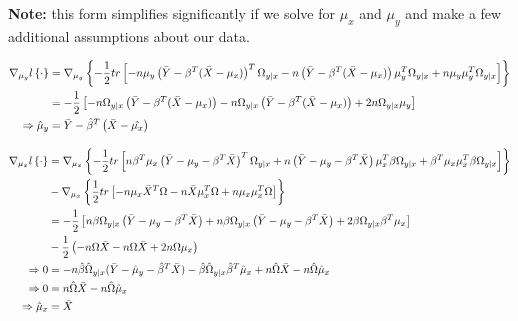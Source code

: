 \documentclass[11pt,]{report}
\begin{document}
\textbf{Note:} this form simplifies significantly if we solve for \(\mu_{x}\) and \(\mu_{y}\) and make a few additional assumptions about our data.

\begin{equation}
\begin{split}
 \nabla_{\mu_{y}}l\left\{\cdot\right\} &= \nabla_{\mu_{y}}\left\{ -\frac{1}{2}tr\left[ -n\mu_{y}\left(\bar{Y} - \beta^{T}(\bar{X} - \mu_{x})\right)^{T}\Omega_{y | x} - n\left(\bar{Y} - \beta^{T}(\bar{X} - \mu_{x})\right)\mu_{y}^{T}\Omega_{y | x} + n\mu_{y}\mu_{y}^{T}\Omega_{y | x} \right] \right\} \\
 &= -\frac{1}{2}\left[ -n\Omega_{y | x}\left(\bar{Y} - \beta^{T}(\bar{X} - \mu_{x}) \right) - n\Omega_{y | x}\left(\bar{Y} - \beta^{T}(\bar{X} - \mu_{x}) \right) + 2n\Omega_{y | x}\mu_{y} \right] \\
 \Rightarrow \hat{\mu}_{y} &= \bar{Y} - \hat{\beta}^{T}\left(\bar{X} - \hat{\mu_{x}}\right)
 \label{eq:gradient2}\notag
\end{split}
\end{equation}

\begin{equation}
\begin{split}
  \nabla_{\mu_{x}}l\left\{\cdot\right\} &= \nabla_{\mu_{x}}\left\{ -\frac{1}{2}tr\left[n\beta^{T}\mu_{x}\left(\bar{Y} - \mu_{y} - \beta^{T}\bar{X} \right)^{T}\Omega_{y | x} + n\left(\bar{Y} - \mu_{y} - \beta^{T}\bar{X} \right)\mu_{x}^{T}\beta\Omega_{y | x} + \beta^{T}\mu_{x}\mu_{x}^{T}\beta\Omega_{y | x} \right] \right\} \\
 &-\nabla_{\mu_{x}}\left\{\frac{1}{2}tr\left[ -n\mu_{x}\bar{X}^{T}\Omega - n\bar{X}\mu_{x}^{T}\Omega + n\mu_{x}\mu_{x}^{T}\Omega \right] \right\} \\
 &= -\frac{1}{2}\left[n\beta\Omega_{y | x}\left(\bar{Y} - \mu_{y} - \beta^{T}\bar{X} \right) + n\beta\Omega_{y | x}\left(\bar{Y} - \mu_{y} - \beta^{T}\bar{X} \right) + 2\beta\Omega_{y | x}\beta^{T}\mu_{x} \right] \\
 &-\frac{1}{2}\left( -n\Omega\bar{X} - n\Omega\bar{X} + 2n\Omega\mu_{x} \right) \\
 \Rightarrow 0 &= -n\hat{\beta}\hat{\Omega}_{y | x}(\bar{Y} - \hat{\mu}_{y} - \hat{\beta}^{T}\bar{X}) - \hat{\beta}\hat{\Omega}_{y | x}\hat{\beta}^{T}\hat{\mu}_{x} + n\hat{\Omega}\bar{X} - n\hat{\Omega}\hat{\mu}_{x} \\
 \Rightarrow 0 &= n\hat{\Omega}\bar{X} - n\hat{\Omega}\hat{\mu}_{x} \\
 \Rightarrow \hat{\mu}_{x} &= \bar{X}
\label{eq:gradient3}\notag
\end{split}
\end{equation}
\end{document}
